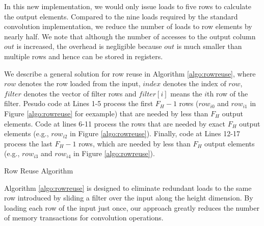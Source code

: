In this new implementation, we would only issue loads to five rows to calculate the output elements. Compared to the nine loads required by
the standard convolution implementation, we reduce the number of loads to row elements by nearly half.  We note that although the number of
accesses to the output column $out$ is increased, the overhead is negligible because $out$ is much smaller than multiple rows and hence can
be stored in registers.

We describe a general solution for row reuse in Algorithm \ref{algo:rowreuse}, where $row$ denotes the row loaded from the input, $index$
denotes the index of $row$, $filter$ denotes the vector of filter rows and $filter[i]$ means the $i$th row of the filter. Pesudo code at
Lines 1-5 process the first $F_H-1$ rows ($row_{i0}$ and $row_{i1}$ in Figure \ref{algo:rowreuse} for eexample) that are needed by less
than $F_H$ output elements. Code at lines 6-11 process the rows that are needed by exact $F_H$ output elements (e.g., $row_{i2}$ in Figure
\ref{algo:rowreuse}). Finally, code at Lines 12-17 process the last $F_H-1$ rows, which are needed by less than $F_H$ output elements
(e.g., $row_{i3}$ and $row_{i4}$ in Figure \ref{algo:rowreuse}).


\begin{algorithm}[t!]
\small
	\caption{Row Reuse Algorithm}
	\label{algo:rowreuse}
\end{algorithm}

Algorithm \ref{algo:rowreuse} is designed to eliminate redundant loads to the same row introduced by sliding a filter over the input along
the height dimension. By loading each row of the input just once, our approach greatly reduces the number of memory transactions for
convolution operations.
